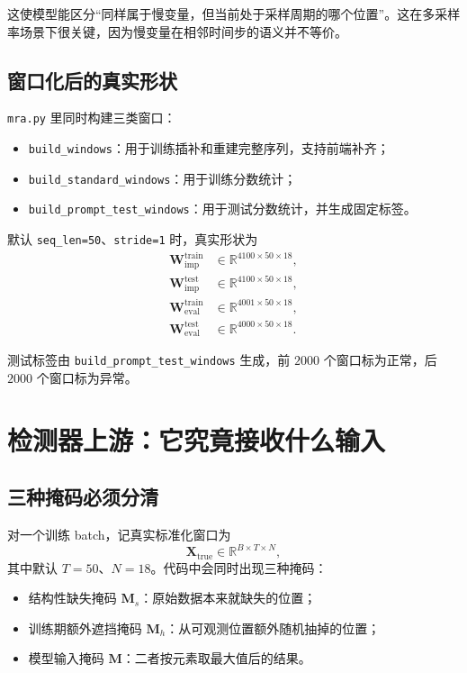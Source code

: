 \documentclass[UTF8]{ctexart}
\begin{document}
这使模型能区分“同样属于慢变量，但当前处于采样周期的哪个位置”。这在多采样率场景下很关键，因为慢变量在相邻时间步的语义并不等价。

\subsection{窗口化后的真实形状}

\texttt{mra.py} 里同时构建三类窗口：
\begin{itemize}
    \item \texttt{build\_windows}：用于训练插补和重建完整序列，支持前端补齐；
    \item \texttt{build\_standard\_windows}：用于训练分数统计；
    \item \texttt{build\_prompt\_test\_windows}：用于测试分数统计，并生成固定标签。
\end{itemize}

默认 \texttt{seq\_len=50}、\texttt{stride=1} 时，真实形状为
\begin{align}
    \bm{W}^{\text{train}}_{\text{imp}} &\in \mathbb{R}^{4100 \times 50 \times 18}, \\
    \bm{W}^{\text{test}}_{\text{imp}} &\in \mathbb{R}^{4100 \times 50 \times 18}, \\
    \bm{W}^{\text{train}}_{\text{eval}} &\in \mathbb{R}^{4001 \times 50 \times 18}, \\
    \bm{W}^{\text{test}}_{\text{eval}} &\in \mathbb{R}^{4000 \times 50 \times 18}.
\end{align}

测试标签由 \texttt{build\_prompt\_test\_windows} 生成，前 \(2000\) 个窗口标为正常，后 \(2000\) 个窗口标为异常。

\section{检测器上游：它究竟接收什么输入}

\subsection{三种掩码必须分清}

对一个训练 batch，记真实标准化窗口为
\begin{equation}
    \bm{X}_{\text{true}} \in \mathbb{R}^{B \times T \times N},
\end{equation}
其中默认 \(T=50\)、\(N=18\)。代码中会同时出现三种掩码：
\begin{itemize}
    \item 结构性缺失掩码 \(\bm{M}_s\)：原始数据本来就缺失的位置；
    \item 训练期额外遮挡掩码 \(\bm{M}_h\)：从可观测位置额外随机抽掉的位置；
    \item 模型输入掩码 \(\bm{M}\)：二者按元素取最大值后的结果。
\end{itemize}
\end{document}
